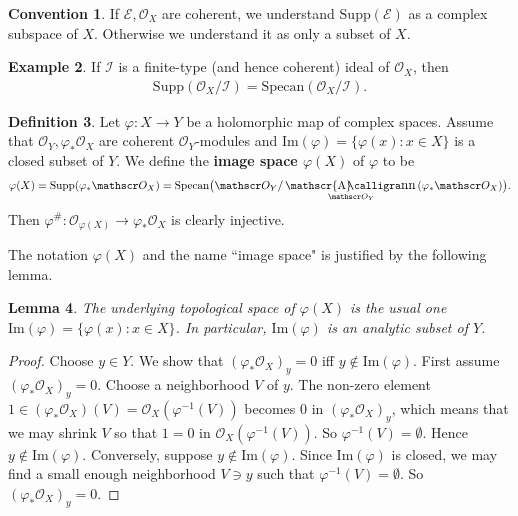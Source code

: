 \documentclass[12pt,b5paper,notitlepage]{report}
\theoremstyle{definition}
\newtheorem{df}{Definition}[section]
\newtheorem{eg}[df]{Example}
\newtheorem{cv}[df]{Convention}
\theoremstyle{plain}
\newtheorem{lm}[df]{Lemma}
\DeclareMathOperator{\sann}{\mathscr{A}\text{\kern -3pt {\calligra\large nn}}\,}
\newcommand{\mc}{\mathcal}
\newcommand{\scr}{\mathscr}
\newcommand{\Imag}{\mathrm{Im}}
\newcommand{\Supp}{\mathrm{Supp}}
\newcommand{\Specan}{\mathrm{Specan}}
\numberwithin{equation}{section}
\begin{document}
\begin{cv}
If $\scr E,\scr O_X$ are coherent, we understand $\Supp(\scr E)$ as a complex subspace of $X$. Otherwise we understand it as only a subset of $X$. 
\end{cv}


\begin{eg}
If $\mc I$ is a finite-type (and hence coherent) ideal of $\scr O_X$, then
\begin{align}
\Supp(\scr O_X/\mc I)=\Specan(\scr O_X/\mc I).
\end{align}
\end{eg}


\begin{df}\label{lb76}
Let $\varphi:X\rightarrow Y$ be a holomorphic map of complex spaces. Assume that $\scr O_Y,\varphi_*\scr O_X$ are coherent $\scr O_Y$-modules and $\Imag(\varphi)=\{\varphi(x):x\in X\}$ is a closed subset of $Y$. We define the \textbf{image space $\varphi(X)$}  of $\varphi$ to be
\begin{align}
\varphi(X)=\Supp(\varphi_*\scr O_X)=\Specan\big(\scr O_Y/\sann_{\scr O_Y}(\varphi_*\scr O_X)\big).
\end{align}
Then $\varphi^\#:\scr O_{\varphi(X)}\rightarrow\varphi_*\scr O_X$ is clearly injective.
\end{df}

The notation $\varphi(X)$ and the name ``image space" is justified by the following lemma.

\begin{lm}
The underlying topological space of $\varphi(X)$ is the usual one $\Imag(\varphi)=\{\varphi(x):x\in X\}$. In particular, $\Imag(\varphi)$ is an analytic subset of $Y$.
\end{lm}


\begin{proof}
Choose $y\in Y$. We show that $(\varphi_*\scr O_X)_y=0$ iff $y\notin\Imag(\varphi)$.  First assume $(\varphi_*\scr O_X)_y=0$. Choose a neighborhood $V$ of $y$. The non-zero element $1\in(\varphi_*\scr O_X)(V)=\scr O_X(\varphi^{-1}(V))$ becomes $0$ in $(\varphi_*\scr O_X)_y$, which means that we may shrink $V$ so that $1=0$ in $\scr O_X(\varphi^{-1}(V))$. So $\varphi^{-1}(V)=\emptyset$. Hence $y\notin\Imag(\varphi)$. Conversely, suppose $y\notin\Imag(\varphi)$. Since $\Imag(\varphi)$ is closed, we may find a small enough neighborhood $V\ni y$ such that $\varphi^{-1}(V)=\emptyset$. So $(\varphi_*\scr O_X)_y=0$.
\end{proof}
\end{document}

